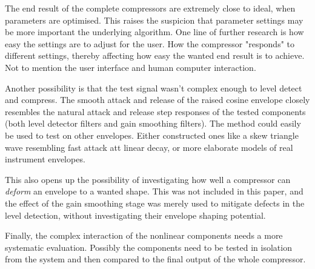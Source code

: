 \documentclass[../main2.tex]{subfiles}
\begin{document}
The end result of the complete compressors are extremely close to ideal, when parameters are optimised. This raises the suspicion that parameter settings may be more important the underlying algorithm. One line of further research is how easy the settings are to adjust for the user. How the compressor "responds" to different settings, thereby affecting how easy the wanted end result is to achieve. Not to mention the user interface and human computer interaction.

Another possibility is that the test signal wasn't complex enough to level detect and compress. The smooth attack and release of the raised cosine envelope closely resembles the natural attack and release step responses of the tested components (both level detector filters and gain smoothing filters). The method could easily be used to test on other envelopes. Either constructed ones like a skew triangle wave resembling fast attack att linear decay, or more elaborate models of real instrument envelopes.

This also opens up the possibility of investigating how well a compressor can \emph{deform} an envelope to a wanted shape. This was not included in this paper, and the effect of the gain smoothing stage was merely used to mitigate defects in the level detection, without investigating their envelope shaping potential.

Finally, the complex interaction of the nonlinear components needs a more systematic evaluation. Possibly the components need to be tested in isolation from the system and then compared to the final output of the whole compressor.  
\end{document}
